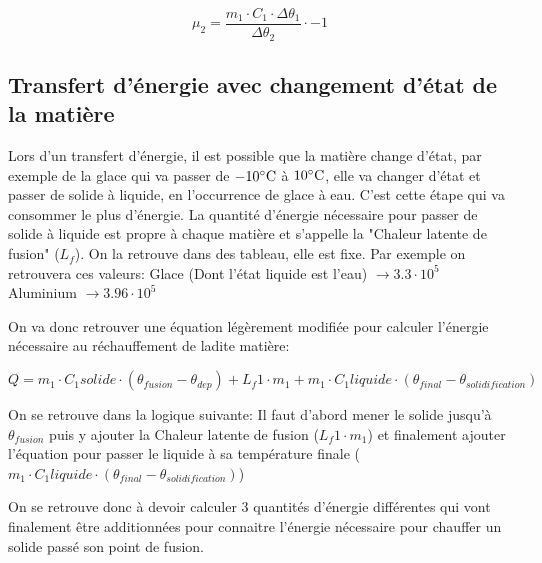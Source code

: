\documentclass{article}
\begin{document}
\begin{equation}
	\mu_2 = \frac{m_1 \cdot C_1 \cdot \Delta\theta_1}{\Delta\theta_2} \cdot -1
\end{equation}

\subsection{Transfert d'énergie avec changement d'état de la matière}

Lors d'un transfert d'énergie, il est possible que la matière change d'état, par exemple de la glace qui va passer de $-10\celsius$ à $10\celsius$, elle va changer d'état et passer de solide à liquide, en l'occurrence de glace à eau.
\newline
C'est cette étape qui va consommer le plus d'énergie. La quantité d'énergie nécessaire pour passer de solide à liquide est propre à chaque matière et s'appelle la "Chaleur latente de fusion" ($L_f$). On la retrouve dans des tableau, elle est fixe.
\newline
\newline
Par exemple on retrouvera ces valeurs:
\newline
\newline
Glace (Dont l'état liquide est l'eau) $\rightarrow 3.3\cdot10^5$
\newline
Aluminium $\rightarrow 3.96 \cdot 10^5$
\newline
\newline

On va donc retrouver une équation légèrement modifiée pour calculer l'énergie nécessaire au réchauffement de ladite matière:

\begin{equation}
	Q = m_1 \cdot C_1solide \cdot (\theta_{fusion} - \theta_{dep}) + L_f1 \cdot m_1 + m_1 \cdot C_1liquide \cdot (\theta_{final} - \theta_{solidification})
\end{equation}

On se retrouve dans la logique suivante:
\newline
\newline
Il faut d'abord mener le solide jusqu'à $\theta_{fusion}$ puis y ajouter la Chaleur latente de fusion ($L_f1 \cdot m_1$) et finalement ajouter l'équation pour passer le liquide à sa température finale ($m_1 \cdot C_1liquide \cdot (\theta_{final} - \theta_{solidification})$)
\newline
\newline

On se retrouve donc à devoir calculer 3 quantités d'énergie différentes qui vont finalement être additionnées pour connaitre l'énergie nécessaire pour chauffer un solide passé son point de fusion.
\end{document}
